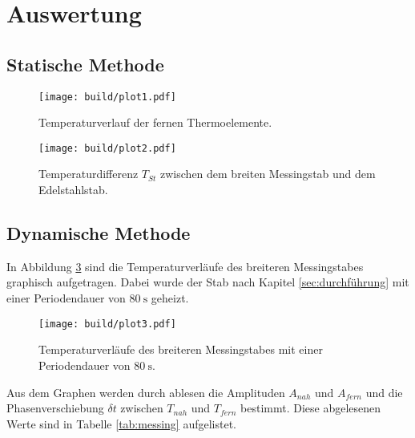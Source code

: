 \section{Auswertung}
\label{sec:auswertung}
\subsection{Statische Methode}
\label{sec:as}

\begin{figure}[H]
    \centering
    \texttt{[image: build/plot1.pdf]}
    \caption{Temperaturverlauf der fernen Thermoelemente.}
    \label{fig:messing}
\end{figure}
\noindent

\begin{figure}[H]
    \centering
    \texttt{[image: build/plot2.pdf]}
    \caption{Temperaturdifferenz $T_{St}$ zwischen dem breiten Messingstab und dem Edelstahlstab.}
    \label{fig:temp}
\end{figure}
\noindent

\subsection{Dynamische Methode}
\label{sec:ad}
In Abbildung \ref{fig:messing} sind die Temperaturverläufe des breiteren Messingstabes graphisch aufgetragen. Dabei wurde der Stab nach Kapitel
\ref{sec:durchführung} mit einer Periodendauer von $\SI{80}{\second}$ geheizt.

\begin{figure}[H]
    \centering
    \texttt{[image: build/plot3.pdf]}
    \caption{Temperaturverläufe des breiteren Messingstabes mit einer Periodendauer von $\SI{80}{\second}$.}
    \label{fig:messing}
\end{figure}
\noindent

Aus dem Graphen werden durch ablesen die Amplituden $A_{nah}$ und $A_{fern}$ und die Phasenverschiebung $\delta t$ zwischen $T_{nah}$ und 
$T_{fern}$ bestimmt. Diese abgelesenen Werte sind in Tabelle \ref{tab:messing}  aufgelistet. 

